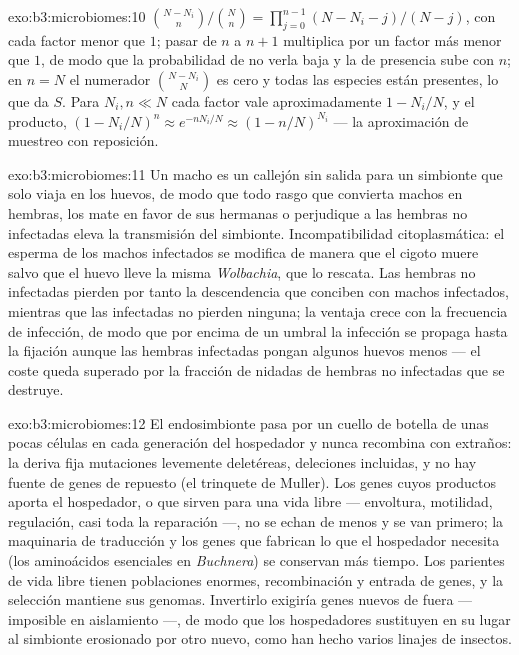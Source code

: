 \begin{solution}{exo:b3:microbiomes:10}
$\binom{N-N_{i}}{n}/\binom{N}{n} = \prod_{j=0}^{n-1}(N - N_{i} - j)/(N -
j)$, con cada factor menor que $1$; pasar de $n$ a $n + 1$ multiplica por
un factor más menor que $1$, de modo que la probabilidad de no verla baja
y la de presencia sube con $n$; en $n = N$ el numerador $\binom{N -
N_{i}}{N}$ es cero y todas las especies están presentes, lo que da $S$.
Para $N_{i},
n \ll N$ cada factor vale aproximadamente $1 - N_{i}/N$, y el producto,
$(1 -
N_{i}/N)^{n} \approx e^{-nN_{i}/N} \approx (1 - n/N)^{N_{i}}$ --- la
aproximación de muestreo con reposición.
\end{solution}

\begin{solution}{exo:b3:microbiomes:11}
Un macho es un callejón sin salida para un simbionte que solo viaja en
los huevos, de modo que todo rasgo que convierta machos en hembras, los
mate en favor de sus hermanas o perjudique a las hembras no infectadas
eleva la transmisión del simbionte. Incompatibilidad citoplasmática: el
esperma de los machos infectados se modifica de manera que el cigoto
muere salvo que el huevo lleve la misma \emph{Wolbachia}, que lo rescata.
Las hembras no infectadas pierden por tanto la descendencia que conciben
con machos infectados, mientras que las infectadas no pierden ninguna; la
ventaja crece con la frecuencia de infección, de modo que por encima de
un umbral la infección se propaga hasta la fijación aunque las hembras
infectadas pongan algunos huevos menos --- el coste queda superado por la
fracción de nidadas de hembras no infectadas que se destruye.
\end{solution}

\begin{solution}{exo:b3:microbiomes:12}
El endosimbionte pasa por un cuello de botella de unas pocas células en
cada generación del hospedador y nunca recombina con extraños: la deriva
fija mutaciones levemente deletéreas, deleciones incluidas, y no hay
fuente de genes de repuesto (el trinquete de Muller). Los genes cuyos
productos aporta el hospedador, o que sirven para una vida libre ---
envoltura, motilidad, regulación, casi toda la reparación ---, no se
echan de menos y se van primero; la maquinaria de traducción y los genes
que fabrican lo que el hospedador necesita (los aminoácidos esenciales en
\emph{Buchnera}) se conservan más tiempo. Los parientes de vida libre
tienen poblaciones enormes, recombinación y entrada de genes, y la
selección mantiene sus genomas. Invertirlo exigiría genes nuevos de fuera
--- imposible en aislamiento ---, de modo que los hospedadores sustituyen
en su lugar al simbionte erosionado por otro nuevo, como han hecho varios
linajes de insectos.
\end{solution}

